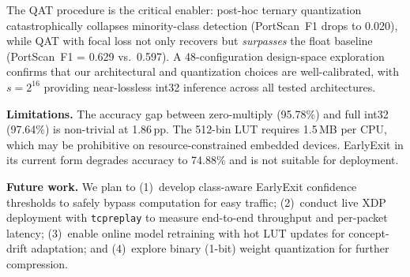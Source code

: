 \documentclass[sigconf,nonacm]{acmart}
\begin{document}
The QAT procedure is the critical enabler: post-hoc ternary quantization
catastrophically collapses minority-class detection (PortScan~F1 drops
to 0.020), while QAT with focal loss not only recovers but \emph{surpasses}
the float baseline (PortScan~F1 = 0.629 vs.\ 0.597).
A 48-configuration design-space exploration confirms that our
architectural and quantization choices are well-calibrated, with
$s = 2^{16}$ providing near-lossless int32 inference across all tested
architectures.

\textbf{Limitations.}
The accuracy gap between zero-multiply (95.78\%) and full int32
(97.64\%) is non-trivial at 1.86\,pp.
The 512-bin LUT requires 1.5\,MB per CPU, which may be prohibitive on
resource-constrained embedded devices.
EarlyExit in its current form degrades accuracy to 74.88\% and is not
suitable for deployment.

\textbf{Future work.}
We plan to
(1)~develop class-aware EarlyExit confidence thresholds to safely
bypass computation for easy traffic;
(2)~conduct live XDP deployment with \texttt{tcpreplay} to measure
end-to-end throughput and per-packet latency;
(3)~enable online model retraining with hot LUT updates for concept-drift
adaptation; and
(4)~explore binary (1-bit) weight quantization for further compression.




\end{document}
